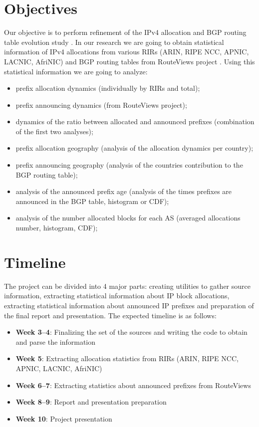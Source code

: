 \documentclass[conference]{IEEEtran}
\begin{document}
\section{Objectives}

Our objective is to perform refinement of the IPv4 allocation and BGP routing table evolution study \cite{Meng:2005:IPv4-address}. In our research we are going to obtain statistical information of IPv4 allocations from various RIRs (ARIN, RIPE NCC, APNIC, LACNIC, AfriNIC) and BGP routing tables from RouteViews project \cite{::Route-Views}. Using this statistical information we are going to analyze:

\begin{itemize}
	\item prefix allocation dynamics (individually by RIRs and total);
	\item prefix announcing dynamics (from RouteViews project);
	\item dynamics of the ratio between allocated and announced prefixes (combination of the first two analyses);
	\item prefix allocation geography (analysis of the allocation dynamics per country);
	\item prefix announcing geography (analysis of the countries contribution to the BGP routing table);
	\item analysis of the announced prefix age (analysis of the times prefixes are announced in the BGP table, histogram or CDF);
	\item analysis of the number allocated blocks for each AS (averaged allocations number, histogram, CDF);
\end{itemize}

\section{Timeline}

The project can be divided into 4 major parts: creating utilities to gather source information, extracting statistical information about IP block allocations, extracting statistical information about announced IP prefixes and preparation of the final report and presentation. The expected timeline is as follows:

\begin{itemize}
\item \textbf{Week 3--4}: Finalizing the set of the sources and writing the code to obtain and parse the information\
\item \textbf{Week 5}: Extracting allocation statistics from RIRs (ARIN, RIPE NCC, APNIC, LACNIC, AfriNIC)
\item \textbf{Week 6--7}: Extracting statistics about announced prefixes from RouteViews
\item \textbf{Week 8--9}: Report and presentation preparation
\item \textbf{Week 10}: Project presentation
\end{itemize}




\end{document}
